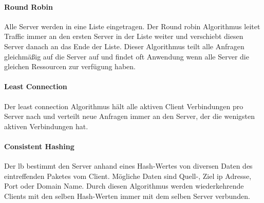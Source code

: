 \paragraph{Round Robin}
Alle Server werden in eine Liste eingetragen. Der Round robin Algorithmus leitet Traffic immer an den ersten Server in der Liste weiter und verschiebt diesen Server danach an das Ende der Liste.
Dieser Algorithmus teilt alle Anfragen gleichmä{\ss}ig auf die Server auf und findet oft Anwendung wenn alle Server die gleichen Ressourcen zur verfügung haben.
\cite{WhatLoadBalancer}

\paragraph{Least Connection}
Der least connection Algorithmus hält alle aktiven Client Verbindungen pro Server nach und verteilt neue Anfragen immer an den Server, der die wenigsten aktiven Verbindungen hat.
\cite{WhatLoadBalancer}

\paragraph{Consistent Hashing}
Der \ac{lb} bestimmt den Server anhand eines Hash-Wertes von diversen Daten des eintreffenden Paketes vom Client.
Mögliche Daten sind Quell-, Ziel \ac{ip} Adresse, Port oder Domain Name. Durch diesen Algorithmus werden wiederkehrende Clients mit den selben Hash-Werten immer mit dem selben Server verbunden.
\cite{WhatLoadBalancer}

